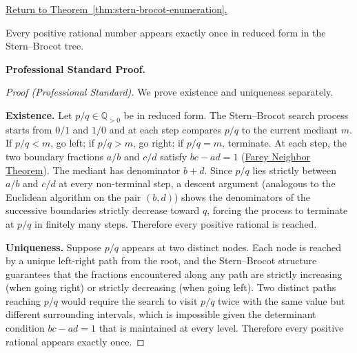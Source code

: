 
\newpage
{}
\label{prf:stern-brocot-enumeration}

\begin{remark*}[Return]
\hyperref[thm:stern-brocot-enumeration]{Return to Theorem~\ref*{thm:stern-brocot-enumeration}.}
\end{remark*}

\begin{theorem*}
Every positive rational number appears exactly once in reduced form in
the Stern--Brocot tree.
\end{theorem*}

\textbf{Professional Standard Proof.}~\\
\begin{proof}
[Proof (Professional Standard)]
We prove existence and uniqueness separately.

\textbf{Existence.} Let $p/q \in \mathbb{Q}_{>0}$ be in reduced form.
The Stern--Brocot search process starts from $0/1$ and $1/0$ and at each
step compares $p/q$ to the current mediant $m$.  If $p/q < m$, go left;
if $p/q > m$, go right; if $p/q = m$, terminate.  At each step, the two
boundary fractions $a/b$ and $c/d$ satisfy $bc - ad = 1$
(\hyperref[thm:farey-neighbor-theorem]{Farey Neighbor Theorem}).  The
mediant has denominator $b + d$.  Since $p/q$ lies strictly between $a/b$
and $c/d$ at every non-terminal step, a descent argument (analogous to
the Euclidean algorithm on the pair $(b, d)$) shows the denominators of
the successive boundaries strictly decrease toward $q$, forcing the process
to terminate at $p/q$ in finitely many steps.
Therefore every positive rational is reached.

\textbf{Uniqueness.} Suppose $p/q$ appears at two distinct nodes.  Each
node is reached by a unique left-right path from the root, and the
Stern--Brocot structure guarantees that the fractions encountered along
any path are strictly increasing (when going right) or strictly decreasing
(when going left).  Two distinct paths reaching $p/q$ would require the
search to visit $p/q$ twice with the same value but different surrounding
intervals, which is impossible given the determinant condition
$bc - ad = 1$ that is maintained at every level.  Therefore every positive
rational appears exactly once.
\end{proof}

